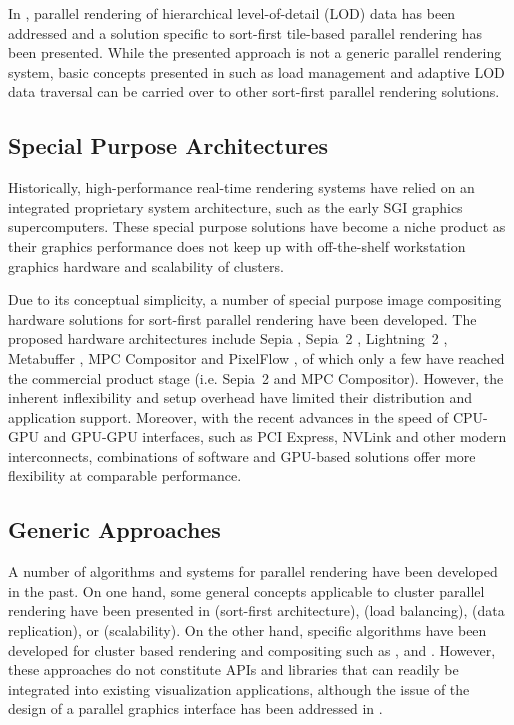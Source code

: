 In \cite{NC:07}, parallel rendering of hierarchical level-of-detail (LOD) data
has been addressed and a solution specific to sort-first tile-based parallel
rendering has been presented. While the presented approach is not a generic
parallel rendering system, basic concepts presented in \cite{NC:07} such as load
management and adaptive LOD data traversal can be carried over to other
sort-first parallel rendering solutions.

\subsection{Special Purpose Architectures}

Historically, high-performance real-time rendering systems have relied on an
integrated proprietary system architecture, such as the early SGI graphics supercomputers. These special purpose solutions have become a niche product as their
graphics performance does not keep up with off-the-shelf workstation graphics
hardware and scalability of clusters.

Due to its conceptual simplicity, a number of special purpose image compositing
hardware solutions for sort-first parallel rendering have been developed. The
proposed hardware architectures include Sepia \cite {MHS:99a,sepia}, Sepia~2
\cite{LMSBHa:01,LMSBH:01}, Lightning~2 \cite{Stoll01}, Metabuffer
\cite{Blanke00,Zhang01}, MPC Compositor \cite{Muraki01} and PixelFlow
\cite{Molnar92,Eyles97}, of which only a few have reached the commercial
product stage (i.e. Sepia~2 and MPC Compositor). However, the inherent
inflexibility and setup overhead have limited their distribution and
application support. Moreover, with the recent advances in the speed of CPU-GPU
and GPU-GPU interfaces, such as PCI Express, NVLink and other modern
interconnects, combinations of software and GPU-based solutions offer more
flexibility at comparable performance.

\subsection{Generic Approaches}

A number of algorithms and systems for parallel rendering have been developed in
the past. On one hand, some general concepts applicable to cluster parallel
rendering have been presented in \cite{Mueller:95,Mueller:97} (sort-first
architecture), \cite{SZFLS:99,SFLS:00} (load balancing), \cite{SFL:01} (data
replication), or \cite{CMF:05,CM:06} (scalability). On the other hand, specific
algorithms have been developed for cluster based rendering and compositing such
as \cite{AP:98}, \cite{CKS:02} and \cite{YYC:01,SMLAP:03}. However, these
approaches do not constitute APIs and libraries that can readily be integrated
into existing visualization applications, although the issue of the design of a
parallel graphics interface has been addressed in \cite{Igehy98}.


